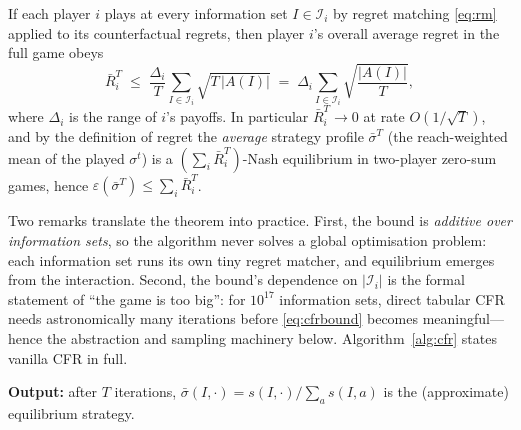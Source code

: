\begin{theorem}\label{thm:cfr}
If each player $i$ plays at every information set $I \in \mathcal{I}_i$ by regret matching \eqref{eq:rm} applied to its counterfactual regrets, then player $i$'s overall average regret in the full game obeys
\begin{equation}\label{eq:cfrbound}
\bar R^{T}_{i} \;\le\; \frac{\Delta_i}{T} \sum_{I \in \mathcal{I}_i} \sqrt{T\,|A(I)|} \;=\; \Delta_i \sum_{I \in \mathcal{I}_i} \sqrt{\frac{|A(I)|}{T}},
\end{equation}
where $\Delta_i$ is the range of $i$'s payoffs. In particular $\bar R_i^T \to 0$ at rate $O(1/\sqrt{T})$, and by the definition of regret the \emph{average} strategy profile $\bar\sigma^T$ (the reach-weighted mean of the played $\sigma^t$) is a $(\sum_i \bar R_i^T)$-Nash equilibrium in two-player zero-sum games, hence $\varepsilon(\bar\sigma^T) \le \sum_i \bar R_i^T$.
\end{theorem}

Two remarks translate the theorem into practice. First, the bound is \emph{additive over information sets}, so the algorithm never solves a global optimisation problem: each information set runs its own tiny regret matcher, and equilibrium emerges from the interaction. Second, the bound's dependence on $|\mathcal{I}_i|$ is the formal statement of ``the game is too big'': for $10^{17}$ information sets, direct tabular CFR needs astronomically many iterations before \eqref{eq:cfrbound} becomes meaningful---hence the abstraction and sampling machinery below. Algorithm~\ref{alg:cfr} states vanilla CFR in full.

\begin{algorithm}[htbp]
\SetAlgoLined
\caption{CFR (one iteration; alternating player updates, CFR$^{+}$ variant).}\label{alg:cfr}
\BlankLine
\textbf{Output:} after $T$ iterations, $\bar\sigma(I,\cdot) = s(I,\cdot)/\sum_a s(I,a)$ is the (approximate) equilibrium strategy.
\end{algorithm}

